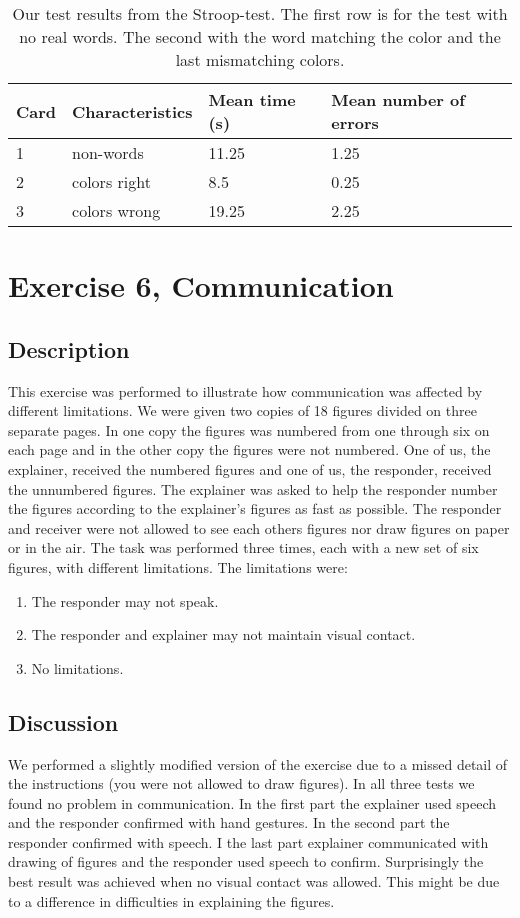 \documentclass[10pt, a4paper]{article}
\begin{document}
\begin{table}
\begin{tabular}{l l l l}
  Card & Characteristics & Mean time (s) & Mean number of errors \\
  \hline
  1 & non-words & 11.25 & 1.25 \\
  2 & colors right & 8.5 & 0.25 \\
  3 & colors wrong & 19.25 & 2.25 \\
\end{tabular}
\caption{\small{Our test results from the Stroop-test. The first row is for the test with no real words. The second with the word matching the color and the last mismatching colors.}}
\end{table}

\section{Exercise 6, Communication}
\subsection{Description}
This exercise was performed to illustrate how communication was affected by different limitations. We were given two copies of 18 figures divided on three separate pages. In one copy the figures was numbered from one through six on each page and in the other copy the figures were not numbered. One of us, the explainer, received the numbered figures and one of us, the responder, received the unnumbered figures. The explainer was asked to help the responder number the figures according to the explainer's figures as fast as possible. The responder and receiver were not allowed to see each others figures nor draw figures on paper or in the air. The task was performed three times, each with a new set of six figures, with different limitations.
The limitations were:
\begin{enumerate}
\item The responder may not speak.
\item The responder and explainer may not maintain visual contact.
\item No limitations.
\end{enumerate}

\subsection{Discussion}
We performed a slightly modified version of the exercise due to a missed detail of the instructions (you were not allowed to draw figures). In all three tests we found no problem in communication. In the first part the explainer used speech and the responder confirmed with hand gestures. In the second part the responder confirmed with speech. I the last part explainer communicated with drawing of figures and the responder used speech to confirm. Surprisingly the best result was achieved when no visual contact was allowed. This might be due to a difference in difficulties in explaining the figures.
\end{document}

